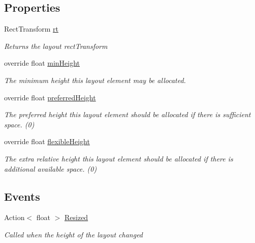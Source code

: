\subsection*{Properties}
\begin{DoxyCompactItemize}
\item 
Rect\+Transform \hyperlink{class_simple_vertical_layout_ad795359277af9d73e622eeaa9feb1b56}{rt}
\begin{DoxyCompactList}\small\item\em Returns the layout rect\+Transform \end{DoxyCompactList}\item 
override float \hyperlink{class_simple_vertical_layout_a6a2d31b8f453ebb0c301f3ff5dfe985f}{min\+Height}
\begin{DoxyCompactList}\small\item\em The minimum height this layout element may be allocated. \end{DoxyCompactList}\item 
override float \hyperlink{class_simple_vertical_layout_a902b0211bd997ab57b046d814de46c78}{preferred\+Height}
\begin{DoxyCompactList}\small\item\em The preferred height this layout element should be allocated if there is sufficient space. (0) \end{DoxyCompactList}\item 
override float \hyperlink{class_simple_vertical_layout_a0f9f9d3c7f50f644a7db913b693a1563}{flexible\+Height}
\begin{DoxyCompactList}\small\item\em The extra relative height this layout element should be allocated if there is additional available space. (0) \end{DoxyCompactList}\end{DoxyCompactItemize}
\subsection*{Events}
\begin{DoxyCompactItemize}
\item 
Action$<$ float $>$ \hyperlink{class_simple_vertical_layout_a3e176b9b3570154346427aa218f8eae8}{Resized}
\begin{DoxyCompactList}\small\item\em Called when the height of the layout changed \end{DoxyCompactList}\end{DoxyCompactItemize}



